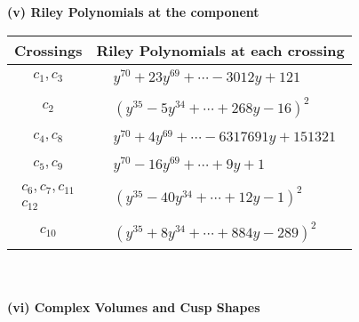 \documentclass[1p]{elsarticle_modified}
\theoremstyle{definition}
\begin{document}
\newpage\renewcommand{\arraystretch}{1}
\flushleft \textbf{(v) Riley Polynomials at the component}\newline \\
\begin{tabular}{m{50pt}|m{274pt}}
Crossings & \hspace{64pt}Riley Polynomials at each crossing \\
\hline $$\begin{aligned}c_{1},c_{3}\end{aligned}$$&$\begin{aligned}
&y^{70}+23 y^{69}+\cdots-3012 y+121
\end{aligned}$\\
\hline $$\begin{aligned}c_{2}\end{aligned}$$&$\begin{aligned}
&(y^{35}-5 y^{34}+\cdots+268 y-16)^{2}
\end{aligned}$\\
\hline $$\begin{aligned}c_{4},c_{8}\end{aligned}$$&$\begin{aligned}
&y^{70}+4 y^{69}+\cdots-6317691 y+151321
\end{aligned}$\\
\hline $$\begin{aligned}c_{5},c_{9}\end{aligned}$$&$\begin{aligned}
&y^{70}-16 y^{69}+\cdots+9 y+1
\end{aligned}$\\
\hline $$\begin{aligned}c_{6},c_{7},c_{11}\\c_{12}\end{aligned}$$&$\begin{aligned}
&(y^{35}-40 y^{34}+\cdots+12 y-1)^{2}
\end{aligned}$\\
\hline $$\begin{aligned}c_{10}\end{aligned}$$&$\begin{aligned}
&(y^{35}+8 y^{34}+\cdots+884 y-289)^{2}
\end{aligned}$\\
\hline
\end{tabular}\\~\\
\newpage\flushleft \textbf{(vi) Complex Volumes and Cusp Shapes}
\end{document}

